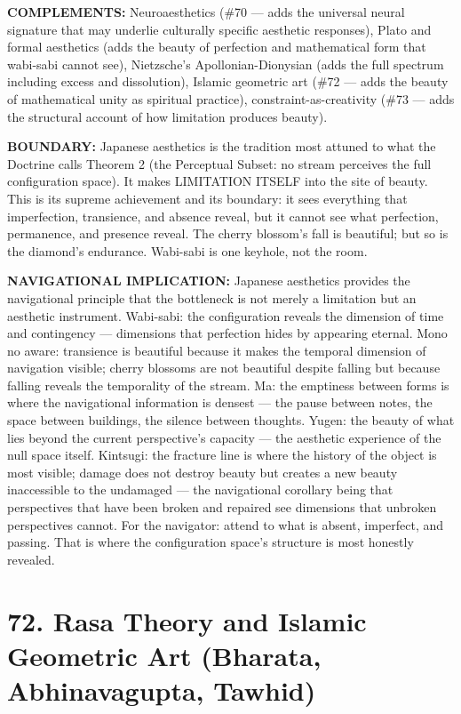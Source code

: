 \textbf{COMPLEMENTS:} Neuroaesthetics (\#70 — adds the universal neural signature that may underlie culturally specific aesthetic responses), Plato and formal aesthetics (adds the beauty of perfection and mathematical form that wabi-sabi cannot see), Nietzsche's Apollonian-Dionysian (adds the full spectrum including excess and dissolution), Islamic geometric art (\#72 — adds the beauty of mathematical unity as spiritual practice), constraint-as-creativity (\#73 — adds the structural account of how limitation produces beauty).


\textbf{BOUNDARY:} Japanese aesthetics is the tradition most attuned to what the Doctrine calls Theorem 2 (the Perceptual Subset: no stream perceives the full configuration space). It makes LIMITATION ITSELF into the site of beauty. This is its supreme achievement and its boundary: it sees everything that imperfection, transience, and absence reveal, but it cannot see what perfection, permanence, and presence reveal. The cherry blossom's fall is beautiful; but so is the diamond's endurance. Wabi-sabi is one keyhole, not the room.


\textbf{NAVIGATIONAL IMPLICATION:} Japanese aesthetics provides the navigational principle that the bottleneck is not merely a limitation but an aesthetic instrument. Wabi-sabi: the configuration reveals the dimension of time and contingency — dimensions that perfection hides by appearing eternal. Mono no aware: transience is beautiful because it makes the temporal dimension of navigation visible; cherry blossoms are not beautiful despite falling but because falling reveals the temporality of the stream. Ma: the emptiness between forms is where the navigational information is densest — the pause between notes, the space between buildings, the silence between thoughts. Yugen: the beauty of what lies beyond the current perspective's capacity — the aesthetic experience of the null space itself. Kintsugi: the fracture line is where the history of the object is most visible; damage does not destroy beauty but creates a new beauty inaccessible to the undamaged — the navigational corollary being that perspectives that have been broken and repaired see dimensions that unbroken perspectives cannot. For the navigator: attend to what is absent, imperfect, and passing. That is where the configuration space's structure is most honestly revealed.


\bigskip\noindent\makebox[\textwidth]{\color{rulegray}\rule{5cm}{0.3pt}}\bigskip


\section*{72. Rasa Theory and Islamic Geometric Art (Bharata, Abhinavagupta, Tawhid)}


